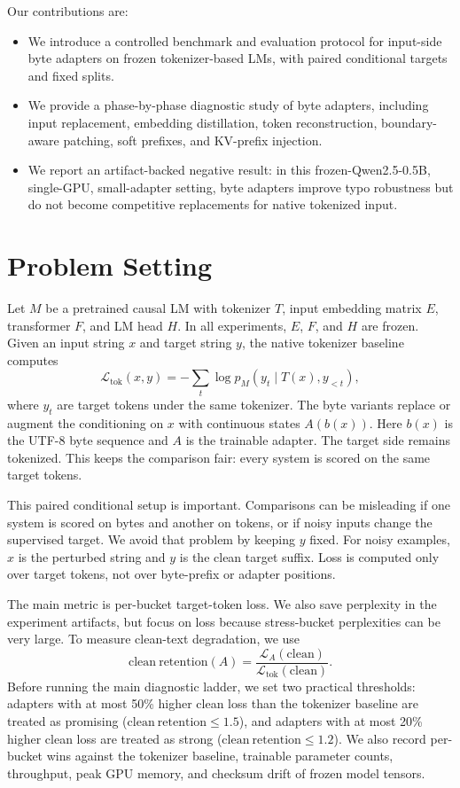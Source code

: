 \documentclass{article}
\newcommand{\qwen}{Qwen2.5-0.5B}
\newcommand{\loss}{\mathcal{L}}
\newcommand{\cratio}{\mathrm{clean\ retention}}
\begin{document}
Our contributions are:
\begin{itemize}
    \item We introduce a controlled benchmark and evaluation protocol for input-side byte adapters on frozen tokenizer-based LMs, with paired conditional targets and fixed splits.
    \item We provide a phase-by-phase diagnostic study of byte adapters, including input replacement, embedding distillation, token reconstruction, boundary-aware patching, soft prefixes, and KV-prefix injection.
    \item We report an artifact-backed negative result: in this frozen-\qwen{}, single-GPU, small-adapter setting, byte adapters improve typo robustness but do not become competitive replacements for native tokenized input.
\end{itemize}

\section{Problem Setting}

Let $M$ be a pretrained causal LM with tokenizer $T$, input embedding matrix $E$, transformer $F$, and LM head $H$. In all experiments, $E$, $F$, and $H$ are frozen. Given an input string $x$ and target string $y$, the native tokenizer baseline computes
\begin{equation}
    \loss_{\mathrm{tok}}(x,y) = - \sum_t \log p_M(y_t \mid T(x), y_{<t}),
\end{equation}
where $y_t$ are target tokens under the same tokenizer. The byte variants replace or augment the conditioning on $x$ with continuous states $A(b(x))$. Here $b(x)$ is the UTF-8 byte sequence and $A$ is the trainable adapter. The target side remains tokenized. This keeps the comparison fair: every system is scored on the same target tokens.

This paired conditional setup is important. Comparisons can be misleading if one system is scored on bytes and another on tokens, or if noisy inputs change the supervised target. We avoid that problem by keeping $y$ fixed. For noisy examples, $x$ is the perturbed string and $y$ is the clean target suffix. Loss is computed only over target tokens, not over byte-prefix or adapter positions.

The main metric is per-bucket target-token loss. We also save perplexity in the experiment artifacts, but focus on loss because stress-bucket perplexities can be very large. To measure clean-text degradation, we use
\begin{equation}
    \cratio(A) = \frac{\loss_A(\mathrm{clean})}{\loss_{\mathrm{tok}}(\mathrm{clean})}.
\end{equation}
Before running the main diagnostic ladder, we set two practical thresholds: adapters with at most 50\% higher clean loss than the tokenizer baseline are treated as promising ($\cratio \leq 1.5$), and adapters with at most 20\% higher clean loss are treated as strong ($\cratio \leq 1.2$). We also record per-bucket wins against the tokenizer baseline, trainable parameter counts, throughput, peak GPU memory, and checksum drift of frozen model tensors.
\end{document}

